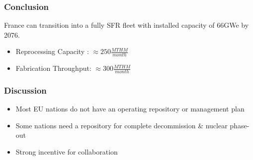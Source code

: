 \begin{frame}
	\frametitle{Conclusion}
	France can transition into
	a fully SFR fleet with installed capacity of 66GWe by 2076.
	\begin{itemize}
		\item Reprocessing Capacity : $\approx 250 \frac{MTHM}{month}$
		\item Fabrication Throughput: $\approx 300 \frac{MTHM}{month}$
	\end{itemize}
\end{frame}

\begin{frame}
	\frametitle{Discussion}
	\begin{itemize}
		\item Most EU nations do not have an operating repository or management plan
		\item Some nations need a repository for complete decommission \& nuclear phase-out	
		\item Strong incentive for collaboration
	\end{itemize}
\end{frame}
